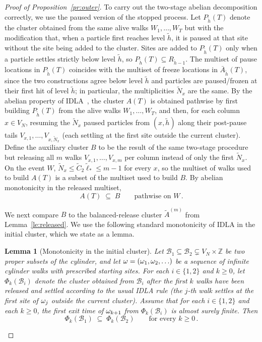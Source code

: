 \documentclass[11pt,a4paper,reqno]{amsart}
\newtheorem{Lemma}[Theorem]{Lemma}
\theoremstyle{definition}
\newcommand{\bbZ}{{\ensuremath{\mathbb Z}} }
\begin{document}
\begin{proof}[Proof of Proposition~\ref{pr:outer}]
To carry out the two-stage abelian decomposition correctly, we use the paused version of the stopped process. Let $P_{\tilde h}(T)$ denote the cluster obtained from the same alive walks $W_1, \ldots, W_T$ but with the modification that, when a particle first reaches level $\tilde h$, it is paused at that site without the site being added to the cluster. Sites are added to $P_{\tilde h}(T)$ only when a particle settles strictly below level $\tilde h$, so $P_{\tilde h}(T) \subseteq R_{\tilde h - 1}$. The multiset of pause locations in $P_{\tilde h}(T)$ coincides with the multiset of freeze locations in $\bar A_{\tilde h}(T)$, since the two constructions agree below level $\tilde h$ and particles are paused/frozen at their first hit of level $\tilde h$; in particular, the multiplicities $\tilde N_x$ are the same. By the abelian property of IDLA~\cite[Section~2]{levine2018long}, the cluster $A(T)$ is obtained pathwise by first building $P_{\tilde h}(T)$ from the alive walks $W_1, \ldots, W_T$, and then, for each column $x \in V_N$, resuming the $\tilde N_x$ paused particles from $(x, \tilde h)$ along their post-pause tails $V_{x, 1}, \ldots, V_{x, \tilde N_x}$ (each settling at the first site outside the current cluster).
Define the auxiliary cluster $B$ to be the result of the same two-stage procedure but releasing all $m$ walks $V_{x, 1}, \ldots, V_{x, m}$ per column instead of only the first $\tilde N_x$. On the event $W$, $\tilde N_x \leq \tilde C_2 \tilde\ell_* \leq m - 1$ for every $x$, so the multiset of walks used to build $A(T)$ is a subset of the multiset used to build $B$. By abelian monotonicity in the released multiset,
\[ A(T) \;\subseteq\; B \qquad \text{pathwise on } W\,. \]

We next compare $B$ to the balanced-release cluster $\widetilde A^{(m)}$ from Lemma~\ref{le:released}. We use the following standard monotonicity of IDLA in the initial cluster, which we state as a lemma.

\begin{Lemma}[Monotonicity in the initial cluster]\label{le:mono-init}
Let $\mathcal{B}_1 \subseteq \mathcal{B}_2 \subsetneq V_N \times \bbZ$ be two proper subsets of the cylinder, and let $\omega = (\omega_1, \omega_2, \ldots)$ be a sequence of infinite cylinder walks with prescribed starting sites. For each $i \in \{1, 2\}$ and $k \geq 0$, let $\Phi_k(\mathcal{B}_i)$ denote the cluster obtained from $\mathcal{B}_i$ after the first $k$ walks have been released and settled according to the usual IDLA rule (the $j$-th walk settles at the first site of $\omega_j$ outside the current cluster). Assume that for each $i \in \{1, 2\}$ and each $k \geq 0$, the first exit time of $\omega_{k+1}$ from $\Phi_k(\mathcal{B}_i)$ is almost surely finite. Then
\[
  \Phi_k(\mathcal{B}_1) \;\subseteq\; \Phi_k(\mathcal{B}_2) \qquad \text{for every } k \geq 0\,.
\]
\end{Lemma}


\end{proof}
\end{document}
